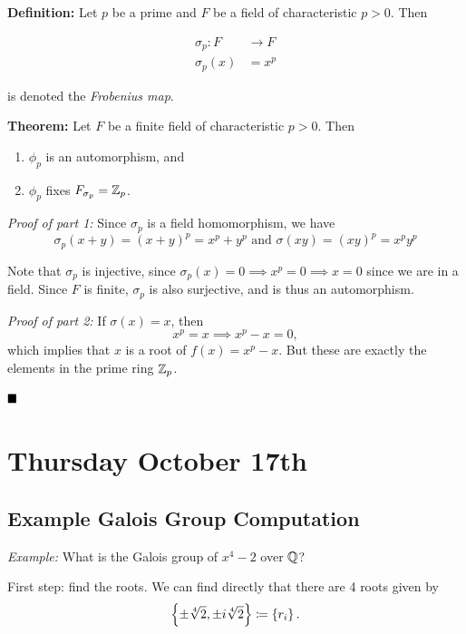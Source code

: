 \textbf{Definition:} Let \(p\) be a prime and \(F\) be a field of
characteristic \(p>0\). Then

\begin{align*}
\sigma_p: F &\to F \\
\sigma_p(x) &= x^p
\end{align*}

is denoted the \emph{Frobenius map}.

\textbf{Theorem:} Let \(F\) be a finite field of characteristic
\(p > 0\). Then

\begin{enumerate}
\def\labelenumi{\arabic{enumi}.}
\tightlist
\item
  \(\phi_p\) is an automorphism, and
\item
  \(\phi_p\) fixes \(F_{\sigma_p} = {\mathbb{Z}}_p\).
\end{enumerate}

\emph{Proof of part 1:} Since \(\sigma_p\) is a field homomorphism, we
have \[
\sigma_p(x+y) = (x+y)^p = x^p + y^p
\text{ and }
\sigma(xy) = (xy)^p = x^p y^p
\]

Note that \(\sigma_p\) is injective, since
\(\sigma_p(x) =0 \implies x^p=0 \implies x=0\) since we are in a field.
Since \(F\) is finite, \(\sigma_p\) is also surjective, and is thus an
automorphism.

\emph{Proof of part 2:} If \(\sigma(x) = x\), then \[
x^p = x \implies x^p-x = 0
,\] which implies that \(x\) is a root of \(f(x) = x^p - x\). But these
are exactly the elements in the prime ring \({\mathbb{Z}}_p\).

\(\qed\)

\hypertarget{thursday-october-17th}{%
\section{Thursday October 17th}\label{thursday-october-17th}}

\hypertarget{example-galois-group-computation}{%
\subsection{Example Galois Group
Computation}\label{example-galois-group-computation}}

\emph{Example:} What is the Galois group of \(x^4-2\) over \({\mathbb{Q}}\)?

First step: find the roots. We can find directly that there are 4 roots
given by \[
\left\{{\pm \sqrt[4] 2, \pm i \sqrt[4] 2}\right\} \coloneqq \left\{{r_i}\right\}
.\]

